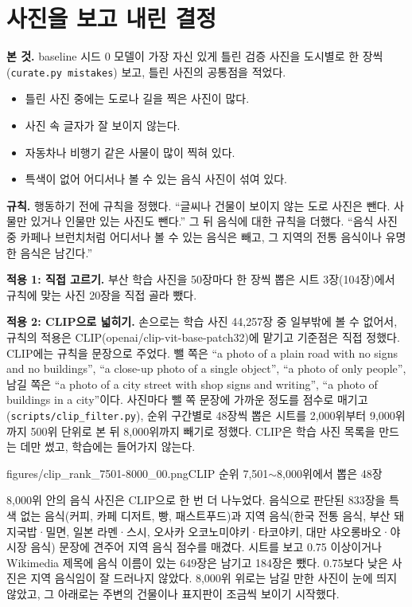 \documentclass[11pt]{article}
\begin{document}
\section*{사진을 보고 내린 결정}


\textbf{본 것.} baseline 시드 0 모델이 가장 자신 있게 틀린 검증 사진을 도시별로 한 장씩
(\texttt{curate.py mistakes}) 보고, 틀린 사진의 공통점을 적었다.
\begin{itemize}
\item 틀린 사진 중에는 도로나 길을 찍은 사진이 많다.
\item 사진 속 글자가 잘 보이지 않는다.
\item 자동차나 비행기 같은 사물이 많이 찍혀 있다.
\item 특색이 없어 어디서나 볼 수 있는 음식 사진이 섞여 있다.
\end{itemize}

\textbf{규칙.} 행동하기 전에 규칙을 정했다. ``글씨나 건물이 보이지 않는 도로 사진은 뺀다.
사물만 있거나 인물만 있는 사진도 뺀다.'' 그 뒤 음식에 대한 규칙을 더했다. ``음식 사진 중
카페나 브런치처럼 어디서나 볼 수 있는 음식은 빼고, 그 지역의 전통 음식이나 유명한 음식은
남긴다.''

\textbf{적용 1: 직접 고르기.} 부산 학습 사진을 50장마다 한 장씩 뽑은 시트 3장(104장)에서
규칙에 맞는 사진 20장을 직접 골라 뺐다.


\textbf{적용 2: CLIP으로 넓히기.} 손으로는 학습 사진 44,257장 중 일부밖에 볼 수 없어서,
규칙의 적용은 CLIP(openai/clip-vit-base-patch32)에 맡기고 기준점은 직접 정했다.
CLIP에는 규칙을 문장으로 주었다. 뺄 쪽은 ``a photo of a plain road with no signs and no
buildings'', ``a close-up photo of a single object'', ``a photo of only people'', 남길 쪽은
``a photo of a city street with shop signs and writing'', ``a photo of buildings in a city''이다.
사진마다 뺄 쪽 문장에 가까운 정도를 점수로 매기고(\texttt{scripts/clip\_filter.py}),
순위 구간별로 48장씩 뽑은 시트를 2,000위부터 9,000위까지 500위 단위로 본 뒤
8,000위까지 빼기로 정했다. CLIP은 학습 사진 목록을 만드는 데만 썼고, 학습에는 들어가지 않는다.

%
{figures/clip_rank_7501-8000_00.png}{CLIP 순위 7,501$\sim$8,000위에서 뽑은 48장}

8,000위 안의 음식 사진은 CLIP으로 한 번 더 나누었다. 음식으로 판단된 833장을
특색 없는 음식(커피, 카페 디저트, 빵, 패스트푸드)과 지역 음식(한국 전통 음식, 부산
돼지국밥·밀면, 일본 라멘·스시, 오사카 오코노미야키·타코야키, 대만 샤오롱바오·야시장 음식)
문장에 견주어 지역 음식 점수를 매겼다. 시트를 보고 0.75 이상이거나 Wikimedia 제목에 음식
이름이 있는 649장은 남기고 184장은 뺐다. 0.75보다 낮은 사진은 지역 음식임이 잘 드러나지 않았다. 8,000위 위로는 남길 만한 사진이 눈에 띄지 않았고, 그 아래로는 주변의 건물이나 표지판이 조금씩 보이기 시작했다.
\end{document}
